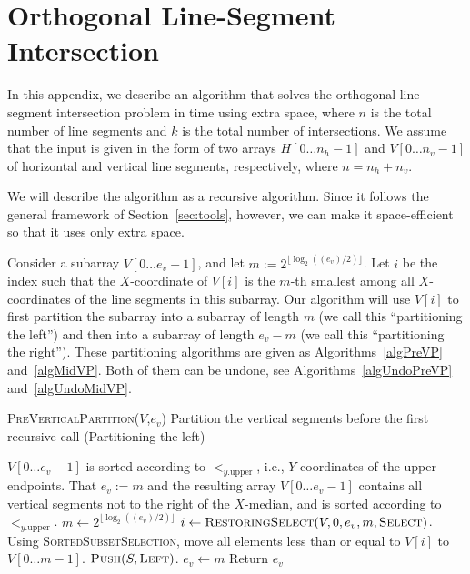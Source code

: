 

\newcommand{\LU}{\ensuremath{<_{y.\mathrm{upper}}}}
\newcommand{\LY}{\ensuremath{<_{y}}}

\section{Orthogonal Line-Segment Intersection}\label{sec:olsi}

In this appendix, we describe an algorithm that solves the
orthogonal line segment intersection problem in
 time using  extra space, where $n$
is the total number of line segments and $k$ is the total number
of intersections. We assume that the input is given in the form
of two arrays ${H}[0\ldots n_h-1]$ and
${V}[0\ldots n_v-1]$ of horizontal and vertical line
segments, respectively, where $n = n_h + n_v$.

We will describe the algorithm as a recursive algorithm. Since it
follows the general framework of Section~\ref{sec:tools}, however, we
can make it space-efficient so that it uses only  extra space.

Consider a subarray ${V}[0\ldots e_v-1]$, and let
$m:=2^{\lfloor \log_2 ((e_v)/2) \rfloor}$. Let $i$ be the index
such that the $X$-coordinate of $V[i]$ is the $m$-th smallest among
all $X$-coordinates of the line segments in this subarray.
Our algorithm will use $V[i]$ to first partition the subarray into a
subarray of length $m$ (we call this ``partitioning the left'') and then
into a subarray of length $e_v-m$ (we call this ``partitioning
the right''). These partitioning algorithms are given as
Algorithms~\ref{algPreVP} and~\ref{algMidVP}. Both of them can be 
undone, see Algorithms~\ref{algUndoPreVP} and~\ref{algUndoMidVP}. 

\begin{algorithm}

  \caption{\textsc{PreVerticalPartition}(${V}$,$e_v$) Partition
  the vertical segments before the first recursive call (Partitioning
  the left)}
  
  \label{algPreVP}
  \begin{algorithmic}[1]
    \REQUIRE ${V}[0\ldots e_v-1]$ is sorted according to
    \LU, i.e., $Y$-coordinates of the upper endpoints. 
    \ENSURE That $e_v:=m$ and the resulting array 
    ${V}[0\ldots e_v-1]$ contains all vertical segments not to the 
    right of the $X$-median, and is sorted according to \LU. 
    \STATE $m \leftarrow 2^{\lfloor \log_2 ((e_v)/2) \rfloor}$
    \STATE $i \leftarrow 
           \textsc{RestoringSelect}({V},0,e_v,m,\textsc{Select})$. 
    \STATE Using \textsc{SortedSubsetSelection}, move all elements
    less than or equal to ${V}[i]$ to ${V}[0\ldots m-1]$.
    \STATE $\textsc{Push}(S,\textsc{Left})$.
    \STATE $e_v \leftarrow m$
    \STATE Return $e_v$
 \end{algorithmic}
\end{algorithm}

